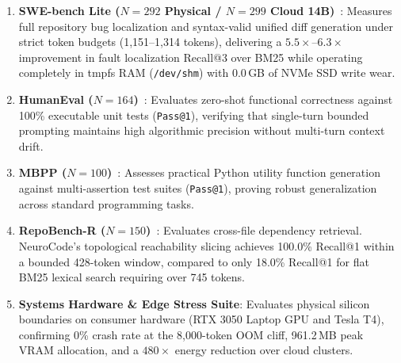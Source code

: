 \documentclass{article}
\begin{document}
\begin{enumerate}
    \item \textbf{SWE-bench Lite ($N=292$ Physical / $N=299$ Cloud 14B)}~\cite{jimenez2024swebench}: Measures full repository bug localization and syntax-valid unified diff generation under strict token budgets (1,151--1,314 tokens), delivering a $5.5\times$--$6.3\times$ improvement in fault localization Recall@3 over BM25 while operating completely in tmpfs RAM (\texttt{/dev/shm}) with 0.0\,GB of NVMe SSD write wear.
    \item \textbf{HumanEval ($N=164$)}~\cite{chen2021humaneval}: Evaluates zero-shot functional correctness against 100\% executable unit tests (\texttt{Pass@1}), verifying that single-turn bounded prompting maintains high algorithmic precision without multi-turn context drift.
    \item \textbf{MBPP ($N=100$)}~\cite{austin2021mbpp}: Assesses practical Python utility function generation against multi-assertion test suites (\texttt{Pass@1}), proving robust generalization across standard programming tasks.
    \item \textbf{RepoBench-R ($N=150$)}~\cite{liu2023repobench}: Evaluates cross-file dependency retrieval. NeuroCode's topological reachability slicing achieves 100.0\% Recall@1 within a bounded 428-token window, compared to only 18.0\% Recall@1 for flat BM25 lexical search requiring over 745 tokens.
    \item \textbf{Systems Hardware \& Edge Stress Suite}: Evaluates physical silicon boundaries on consumer hardware (RTX 3050 Laptop GPU and Tesla T4), confirming 0\% crash rate at the 8,000-token OOM cliff, 961.2\,MB peak VRAM allocation, and a $480\times$ energy reduction over cloud clusters.
\end{enumerate}
\end{document}
